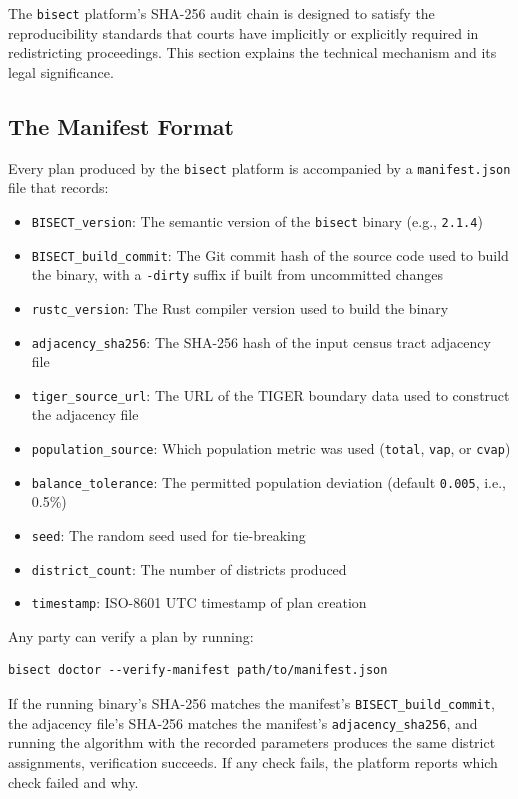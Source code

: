 The \texttt{bisect} platform's SHA-256 audit chain is designed to satisfy the reproducibility standards that courts have implicitly or explicitly required in redistricting proceedings. This section explains the technical mechanism and its legal significance.

\subsection{The Manifest Format}

Every plan produced by the \texttt{bisect} platform is accompanied by a \texttt{manifest.json} file that records:

\begin{itemize}
  \item \texttt{BISECT\_version}: The semantic version of the \texttt{bisect} binary (e.g., \texttt{2.1.4})
  \item \texttt{BISECT\_build\_commit}: The Git commit hash of the source code used to build the binary, with a \texttt{-dirty} suffix if built from uncommitted changes
  \item \texttt{rustc\_version}: The Rust compiler version used to build the binary
  \item \texttt{adjacency\_sha256}: The SHA-256 hash of the input census tract adjacency file
  \item \texttt{tiger\_source\_url}: The URL of the TIGER boundary data used to construct the adjacency file
  \item \texttt{population\_source}: Which population metric was used (\texttt{total}, \texttt{vap}, or \texttt{cvap})
  \item \texttt{balance\_tolerance}: The permitted population deviation (default \texttt{0.005}, i.e., 0.5\%)
  \item \texttt{seed}: The random seed used for tie-breaking
  \item \texttt{district\_count}: The number of districts produced
  \item \texttt{timestamp}: ISO-8601 UTC timestamp of plan creation
\end{itemize}

Any party can verify a plan by running:
\begin{verbatim}
bisect doctor --verify-manifest path/to/manifest.json
\end{verbatim}

If the running binary's SHA-256 matches the manifest's \texttt{BISECT\_build\_commit}, the adjacency file's SHA-256 matches the manifest's \texttt{adjacency\_sha256}, and running the algorithm with the recorded parameters produces the same district assignments, verification succeeds. If any check fails, the platform reports which check failed and why.

